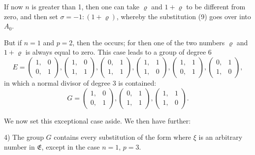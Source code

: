 
If now $n$ is greater than 1, then one can take $\varrho$ and $1+\varrho$ to be different from zero, and then set $\sigma=-1:(1+\varrho)$, whereby the substitution (9) goes over into $A_0$.

But if $n=1$ and $p=2$, then the  occurs; for then one of the two numbers $\varrho$ and $1+\varrho$ is always equal to zero. This case leads to a group of degree $6$
\[
E = \begin{pmatrix}1,&0\\0,&1\end{pmatrix}, \begin{pmatrix}1,&0\\1,&1\end{pmatrix}, \begin{pmatrix}0,&1\\1,&1\end{pmatrix}, \begin{pmatrix}1,&1\\1,&0\end{pmatrix}, \begin{pmatrix}1,&1\\0,&1\end{pmatrix}, \begin{pmatrix}0,&1\\1,&0\end{pmatrix},
\]
in which a normal divisor of degree $3$ is contained:
\[
G = \begin{pmatrix}1,&0\\0,&1\end{pmatrix}, \begin{pmatrix}0,&1\\1,&1\end{pmatrix}, \begin{pmatrix}1,&1\\1,&0\end{pmatrix}.
\]

We now set this exceptional case aside. We then have further:

4) The group $G$ contains every substitution of the form
where $\xi$ is an arbitrary number in $\mathfrak{E}$, except in the case $n=1$, $p=3$.

